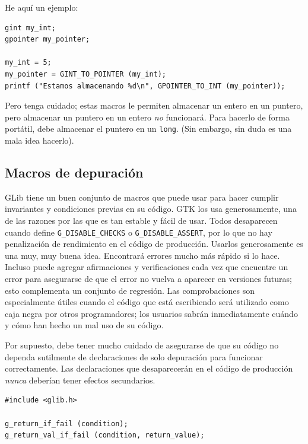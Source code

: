 He aquí un ejemplo:
\begin{lstlisting}[style=GLib/GTK]
gint my_int;
gpointer my_pointer;

my_int = 5;
my_pointer = GINT_TO_POINTER (my_int);
printf ("Estamos almacenando %d\n", GPOINTER_TO_INT (my_pointer));
\end{lstlisting}

Pero tenga cuidado; estas macros le permiten almacenar un entero en un puntero, pero almacenar un puntero en un entero \emph{no} funcionará. Para hacerlo de forma portátil, debe almacenar el puntero en un \lstinline{long}. (Sin embargo, sin duda es una mala idea hacerlo).

\subsection{Macros de depuración}
\label{glib-debugging-macros}

GLib tiene un buen conjunto de macros que puede usar para hacer cumplir invariantes y condiciones previas en su código. GTK los usa generosamente, una de las razones por las que es tan estable y fácil de usar. Todos desaparecen cuando define \lstinline{G_DISABLE_CHECKS} o \lstinline{G_DISABLE_ASSERT}, por lo que no hay penalización de rendimiento en el código de producción. Usarlos generosamente es una muy, muy buena idea. Encontrará errores mucho más rápido si lo hace. Incluso puede agregar afirmaciones y verificaciones cada vez que encuentre un error para asegurarse de que el error no vuelva a aparecer en versiones futuras; esto complementa un conjunto de regresión. Las comprobaciones son especialmente útiles cuando el código que está escribiendo será utilizado como caja negra por otros programadores; los usuarios sabrán inmediatamente cuándo y cómo han hecho un mal uso de su código.

Por supuesto, debe tener mucho cuidado de asegurarse de que su código no dependa sutilmente de declaraciones de solo depuración para funcionar correctamente. Las declaraciones que desaparecerán en el código de producción \emph{nunca} deberían tener efectos secundarios.

\begin{lstlisting}[style=GLib/GTK, caption={Comprobaciones de condiciones previas}, label=glib-precondition]
#include <glib.h>

g_return_if_fail (condition);
g_return_val_if_fail (condition, return_value);
\end{lstlisting}

